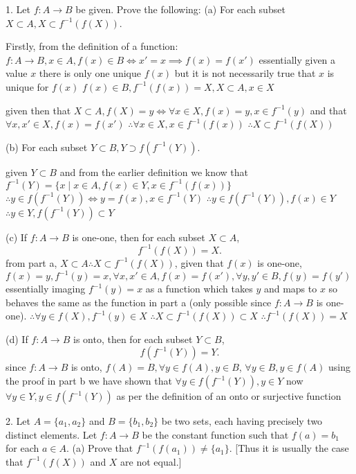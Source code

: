 1. Let $f:A \rightarrow B$ be given. Prove the following:
(a) For each subset $X \subset A, X \subset f^{-1}(f(X))$.

Firstly, from the definition of a function: $f:A \rightarrow B, x \in A, f(x) \in B \iff x' = x \implies f(x) = f(x')$  essentially given a value $x$ there is only one unique $f(x)$ but it is not necessarily true that $x$ is unique for $f(x)$ $f(x) \in B, f^{-1}(f(x)) = X, X \subset A, x \in X$

given then that $X \subset A, f(X) =  y \iff \forall x \in X, f(x) = y, x \in f^{-1}(y)$ and that $\forall x, x' \in X, f(x) = f(x')$
$\therefore \forall x \in X, x \in f^{-1}(f(x))$
$\therefore X \subset f^{-1}(f(X))$

(b) For each subset $Y \subset B, Y \supset f(f^{-1}(Y))$.

given $Y \subset B$ and from the earlier definition we know that $f^{-1}(Y) = \{ x \mid x \in A, f(x) \in Y, x \in f^{-1}(f(x))\}$
$\therefore y \in f(f^{-1}(Y)) \iff y = f(x), x \in f^{-1}(Y)$
$\therefore y \in f(f^{-1}(Y)),  f(x) \in Y $
$\therefore y \in Y, f(f^{-1}(Y)) \subset Y$

(c) If $f:A \rightarrow B$ is one-one, then for each subset $X \subset A$, $$f^{-1}(f(X)) = X.$$
from part a, $X \subset A \therefore X \subset f^{-1}(f(X))$, given that $f(x)$ is one-one, $f(x) = y, f^{-1}(y) = x, \forall x, x' \in A, f(x) = f(x'), \forall y, y' \in B, f(y) = f(y')$
essentially imaging $f^{-1}(y) = x$ as a function which takes $y$ and maps to $x$ so behaves the same as the function in part a (only possible since $f:A \rightarrow B$ is one-one).
$\therefore \forall y \in f(X), f^{-1}(y) \in X$
$\therefore X \subset f^{-1}(f(X)) \subset X$
$\therefore f^{-1}(f(X)) = X$

(d) If $f: A \rightarrow B$ is onto, then for each subset $Y \subset B$, $$f(f^{-1}(Y)) = Y.$$
since $f: A \rightarrow B$ is onto, $f(A) = B, \forall y \in  f(A), y \in B$, $\forall y \in B, y \in f(A)$
using the proof in part b we have shown that $\forall y \in f(f^{-1}(Y)), y \in Y$ 
now $\forall y \in Y, y \in f(f^{-1}(Y))$ as per the definition of an onto or surjective function

2. Let $A = \{ a_{1}, a_{2}\}$ and $B = \{ b_{1}, b_{2}\}$ be two sets, each having precisely two distinct elements. Let $f:A \rightarrow B$ be the constant function such that $f(a) = b_{1}$ for each $a \in A$.
(a) Prove that $f^{-1}(f(a_{1})) \not = \{a_{1}\}$. [Thus it is usually the case that $f^{-1}(f(X))$ and $X$ are not equal.]

